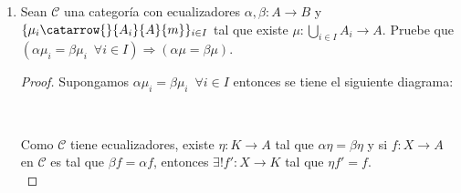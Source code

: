 \documentclass{article}
\begin{document}
\begin{enumerate}[label=\textbf{Ej \arabic*.}]
\begin{proof}
Sean $r\in R$, $a,b\in \displaystyle\sum_{i\in I}Im(\alpha_i)$ y supongamos que 
\begin{align*}
a&=\alpha_{h_0}(a_0)+\ldots+\alpha_{h_n}(a_n)\\
b&=\alpha_{k_0}(b_0)+\ldots+\alpha_{k_m}(b_m)\qquad n,m\in \mathbb{N}.
\end{align*}

Así 
\begin{gather*}
g(ra+b)=g\left(r\alpha_{h_0}(a_0)+\ldots+r\alpha_{h_n}(a_n)+r\alpha_{k_0}(b_0)+\ldots+r\alpha_{k_m}(b_m)\right)\\
=g\left(\alpha_{h_0}(ra_0)+\ldots+\alpha_{h_n}(ra_n)+\alpha_{k_0}(b_0)+\ldots+\alpha_{k_m}(b_m)\right)\\
=f'_{h_0}(ra_0)+\ldots+f'_{h_n}(ra_n)+f'_{k_0}(b_0)+\ldots+f'_{k_m}(b_m)\\
=\left(rf'_{h_0}(a_0)+\ldots+rf'_{h_n}(a_n)\right)+f'_{k_0}(b_0)+\ldots+f'_{k_m}(b_m)\\
=r\left(f'_{h_0}(a_0)+\ldots+f'_{h_n}(a_n)\right)+f'_{k_0}(b_0)+\ldots+f'_{k_m}(b_m)\\
=rg(a)+g(b).
\end{gather*}
Por lo tanto es morfismo.\\

Así $\forall x\in \displaystyle\sum_{i\in I}Im(\alpha_i)$ se tiene que 
\begin{gather*}
\mu g(x)=\mu \left(\sum_{k=0}^nf'_{i_k}(x_k)\right)
=\sum_{k=0}^n\mu f'_{i_k}(x_k)\\
=\sum_{k=0}^n f\alpha_{i_k}(x_k)
=f\left(\sum_{k=0}^n\alpha_{i_k}(x_k)\right)\\
=f\nu(x).
\end{gather*}
Por lo tanto $\displaystyle\sum_{i\in I}Im(\alpha_i)$ es la unión categorica.

\end{proof}

\item Sean $\mathscr{C}$ una categoría con ecualizadores $\alpha,\beta\colon A\to B$ y \\ $\{\mu_i\catarrow{}{A_i}{A}{m}\}_{i\in I}$ tal que 
existe $\mu:\displaystyle\bigcup_{i\in I}A_i\longrightarrow A.$ Pruebe que \\ $\left(\alpha\mu_i=\beta\mu_i\,\,\,\forall i\in I\right)\Rightarrow
\left(\alpha\mu=\beta\mu\right).$
\begin{proof}

Supongamos $\alpha\mu_i=\beta\mu_i\,\,\,\forall i\in I$ entonces se tiene el siguiente diagrama:
\\
\centerline{
\,
}
Como $\mathscr{C}$ tiene ecualizadores, existe $\eta:K\to A$ tal que $\alpha\eta=\beta\eta$ y si $f:X\to A$ en $\mathscr{C}$ es tal que
 $\beta f=\alpha f$, entonces $\exists ! f':X\to K$ tal que $\eta f'=f$. \\


\end{proof}
\end{enumerate}
\end{document}
